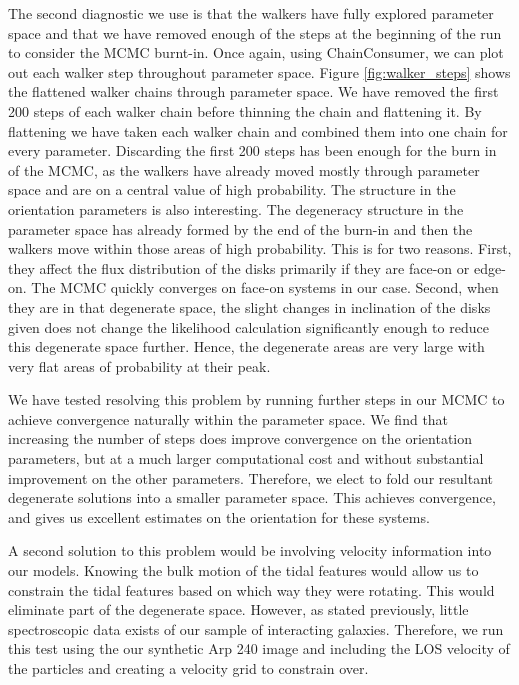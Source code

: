 The second diagnostic we use is that the walkers have fully explored parameter space and that we have removed enough of the steps at the beginning of the run to consider the MCMC burnt-in. Once again, using ChainConsumer, we can plot out each walker step throughout parameter space. Figure \ref{fig:walker_steps} shows the flattened walker chains through parameter space. We have removed the first 200 steps of each walker chain before thinning the chain and flattening it. By flattening we have taken each walker chain and combined them into one chain for every parameter. Discarding the first 200 steps has been enough for the burn in of the MCMC, as the walkers have already moved mostly through parameter space and are \DIFdelbegin {}\DIFdelend \DIFaddbegin {}\DIFaddend on a central value of high probability. The structure in the orientation parameters is also interesting. The degeneracy structure in the parameter space has already formed by the end of the burn-in and then the walkers move within those areas of high probability. This is for two reasons. First, they affect the flux distribution of the disks primarily \DIFdelbegin {}\DIFdelend if they are face-on or edge-on. The MCMC quickly converges on face-on systems in our case. Second, when they are in that degenerate space, the slight changes in inclination of the disks given does not change the likelihood calculation significantly enough to reduce this degenerate space further. Hence, the degenerate areas are very large with very flat areas of probability at their peak.

We have tested resolving this problem by running further steps in our MCMC to achieve convergence naturally within the parameter space. We find that increasing the number of steps does improve convergence on the orientation parameters, but at a much larger computational cost and without substantial improvement on the other parameters. Therefore, we elect to fold our resultant degenerate solutions into a smaller parameter space. This achieves convergence, and gives us excellent estimates on the orientation for these systems.

A second solution to this problem would be involving velocity information into our models. Knowing the bulk motion of the tidal features would allow us to constrain the tidal features based on which way they were rotating. This would eliminate part of the degenerate space. However, as stated previously, little spectroscopic data exists of our sample of interacting galaxies. Therefore, we run this test using the our synthetic Arp 240 image and including the LOS velocity of the particles and creating a velocity grid to constrain over.

